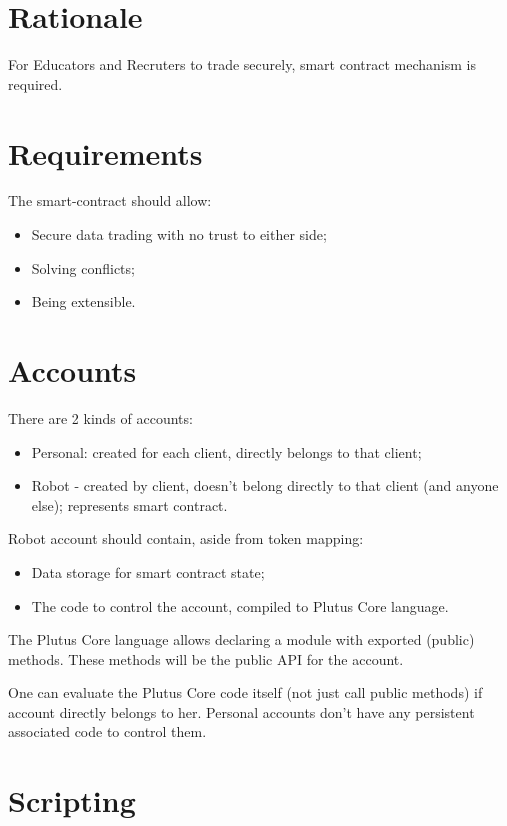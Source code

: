\documentclass[a4paper]{article}
\date{
  Version 0.1
  \today
}
\begin{document}
\section*{Rationale}

For Educators and Recruters to trade securely, smart contract mechanism is required.

\section*{Requirements}

The smart-contract should allow:
\begin{itemize}
  \item Secure data trading with no trust to either side;
  \item Solving conflicts;
  \item Being extensible.
\end{itemize}

\section*{Accounts}

There are 2 kinds of accounts:
\begin{itemize}
  \item Personal: created for each client, directly belongs to that client;
  \item Robot - created by client, doesn't belong directly to that client (and anyone else); represents smart contract.
\end{itemize}

Robot account should contain, aside from token mapping:
\begin{itemize}
  \item Data storage for smart contract state;
  \item The code to control the account, compiled to Plutus Core language.
\end{itemize}

The Plutus Core language allows declaring a module with exported (public) methods.
These methods will be the public API for the account.

One can evaluate the Plutus Core code itself (not just call public methods) if account directly belongs to her.
Personal accounts don't have any persistent associated code to control them.

\section*{Scripting}
\end{document}
